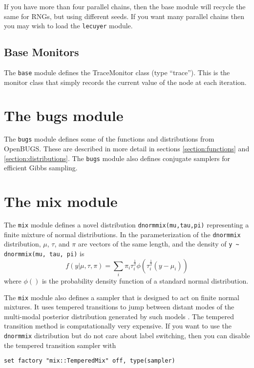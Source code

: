 \documentclass[11pt, a4paper, titlepage]{report}
\newcommand{\OpenBUGS}{\textsf{OpenBUGS}}
\begin{document}
If you have more than four parallel chains, then the base module will
recycle the same for RNGs, but using different seeds. If you want many
parallel chains then you may wish to load the \verb+lecuyer+ module.

\subsection{Base Monitors}

The \verb+base+ module defines the TraceMonitor class (type
``trace''). This is the monitor class that simply records the current
value of the node at each iteration.

\section{The bugs module}

The \verb+bugs+ module defines some of the functions and distributions
from \OpenBUGS. These are described in more detail in sections
\ref{section:functions} and \ref{section:distributions}.  The
\verb+bugs+ module also defines conjugate samplers for efficient Gibbs
sampling.

\section{The mix module}

The \verb+mix+ module defines a novel distribution
\verb+dnormmix(mu,tau,pi)+ representing a finite mixture of normal
distributions. In the parameterization of the \verb+dnormmix+
distribution, $\mu$, $\tau$, and $\pi$ are vectors of the same length,
and the density of \verb+y ~ dnormmix(mu, tau, pi)+ is
\[
f(y | \mu, \tau, \pi) = \sum_i \pi_i \tau_i^{\frac{1}{2}} \phi( \tau^{\frac{1}{2}}_i (y - \mu_i))
\]
where $\phi()$ is the probability density function of a standard
normal distribution.

The \verb+mix+ module also defines a sampler that is designed to act
on finite normal mixtures. It uses tempered transitions to jump
between distant modes of the multi-modal posterior distribution
generated by such models \cite{Neal94,Celeux99}. The tempered
transition method is computationally very expensive. If you want to
use the \verb+dnormmix+ distribution but do not care about label
switching, then you can disable the tempered transition sampler with
\begin{verbatim}
set factory "mix::TemperedMix" off, type(sampler)
\end{verbatim}
\end{document}

